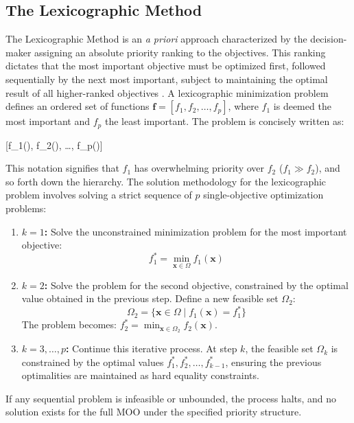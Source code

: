 \documentclass[11pt,pdflatex,sn-mathphys-ay]{sn-jnl}%
\theoremstyle{definition}
\theoremstyle{thmstyleone}%
\theoremstyle{thmstyletwo}%
\theoremstyle{thmstylethree}%
\begin{document}
\begin{appendices}
		\subsection{The Lexicographic Method}
		The Lexicographic Method is an \textit{a priori} approach characterized by the decision-maker assigning an absolute priority ranking to the objectives. This ranking dictates that the most important objective must be optimized first, followed sequentially by the next most important, subject to maintaining the optimal result of all higher-ranked objectives \cite{isermann1982linear, miettinen1999nonlinear, ehrgott2005multicriteria}.
		A lexicographic minimization problem defines an ordered set of functions $\bm{f}=[f_1,f_2,\dots,f_p]$, where $f_1$ is deemed the most important and $f_p$ the least important. The problem is concisely written as:
		\begin{mini!}{ \in \Omega}{ [f_1(), f_2(), \dots, f_p()]}{}{}
		\end{mini!}
		This notation signifies that $f_1$ has overwhelming priority over $f_2$ ($f_1 \gg f_2$), and so forth down the hierarchy.
		The solution methodology for the lexicographic problem involves solving a strict sequence of $p$ single-objective optimization problems:
		\begin{enumerate}[label=\textbf{Step \arabic*:}, leftmargin=*]
			\item \textbf{$k=1$:} Solve the unconstrained minimization problem for the most important objective:
			$$f_1^* = \min_{\bm{x} \in \Omega} f_1(\bm{x})$$
			\item \textbf{$k=2$:} Solve the problem for the second objective, constrained by the optimal value obtained in the previous step. Define a new feasible set $\Omega_2$:
			$$\Omega_2 = \{ \bm{x} \in \Omega \mid f_1(\bm{x}) = f_1^* \}$$
			The problem becomes: $\displaystyle f_2^* = \min_{\bm{x} \in \Omega_2} f_2(\bm{x})$.
			\item \textbf{$k=3, \dots, p$:} Continue this iterative process. At step $k$, the feasible set $\Omega_k$ is constrained by the optimal values $f_1^*, f_2^*, \dots, f_{k-1}^*$, ensuring the previous optimalities are maintained as hard equality constraints.
		\end{enumerate}
		If any sequential problem is infeasible or unbounded, the process halts, and no solution exists for the full MOO under the specified priority structure.
		\begin{algorithm}[H]
			\caption{Lexicographic Sequential Solution Algorithm}

\end{algorithm}
\end{appendices}
\end{document}
